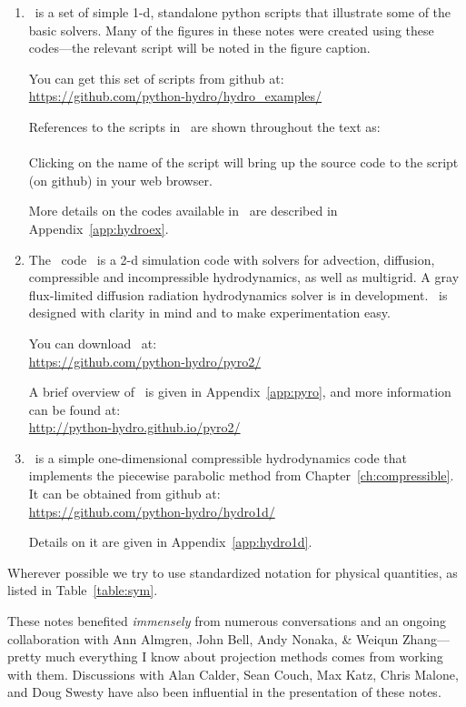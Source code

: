 \begin{enumerate}
\item \hydroex\ is a set of simple 1-d, standalone python scripts
  that illustrate some of the basic solvers.  Many of the figures
  in these notes were created using these codes---the relevant
  script will be noted in the figure caption.

  You can get this set of scripts from github at:\\
  \url{https://github.com/python-hydro/hydro_examples/}

  References to the scripts in \hydroex\ are shown throughout
  the text as: \\[0.5em]
   \\[0.5em]
  Clicking on the name of the script will bring up the source code
  to the script (on github) in your web browser.

  More details on the codes available in \hydroex\ are described
  in Appendix~\ref{app:hydroex}.

\item
  The \pyro\ code~\cite{pyro} is a 2-d simulation code with
  solvers for advection, diffusion, compressible and incompressible
  hydrodynamics, as well as multigrid.  A gray flux-limited diffusion
  radiation hydrodynamics solver is
  in development.  \pyro\ is designed with clarity in mind and to make
  experimentation easy.

  You can download \pyro\ at: \\
  \url{https://github.com/python-hydro/pyro2/}

  A brief overview of \pyro\ is given in Appendix~\ref{app:pyro},
  and more information can be found at: \\
\url{http://python-hydro.github.io/pyro2/}

\item \hydrooned\ is a simple one-dimensional compressible
  hydrodynamics code that implements the piecewise parabolic method
  from Chapter~\ref{ch:compressible}.  It can be obtained from
  github at:\\
  \url{https://github.com/python-hydro/hydro1d/}

  Details on it are given in
  Appendix~\ref{app:hydro1d}.
\end{enumerate}

Wherever possible we try to use standardized notation for physical
quantities, as listed in Table~\ref{table:sym}.

These notes benefited {\em immensely} from numerous conversations and
an ongoing collaboration with Ann Almgren, John Bell, Andy Nonaka, \&
Weiqun Zhang---pretty much everything I know about projection methods
comes from working with them.  Discussions with Alan Calder, Sean
Couch, Max Katz, Chris Malone, and Doug Swesty have also been
influential in the presentation of these notes.

